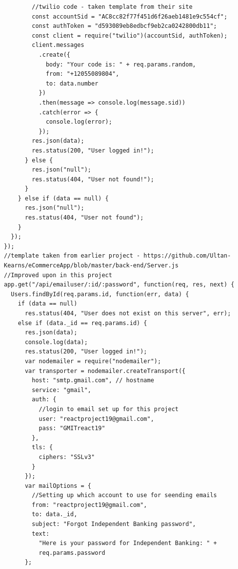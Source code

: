 \begin{verbatim}
        //twilio code - taken template from their site
        const accountSid = "AC8cc82f77f451d6f26aeb1481e9c554cf";
        const authToken = "d593089eb8edbcf9eb2ca0242800db11";
        const client = require("twilio")(accountSid, authToken);
        client.messages
          .create({
            body: "Your code is: " + req.params.random,
            from: "+12055089804",
            to: data.number
          })
          .then(message => console.log(message.sid))
          .catch(error => {
            console.log(error);
          });
        res.json(data);
        res.status(200, "User logged in!");
      } else {
        res.json("null");
        res.status(404, "User not found!");
      }
    } else if (data == null) {
      res.json("null");
      res.status(404, "User not found");
    }
  });
});
//template taken from earlier project - https://github.com/Ultan-Kearns/eCommerceApp/blob/master/back-end/Server.js
//Improved upon in this project
app.get("/api/emailuser/:id/:password", function(req, res, next) {
  Users.findById(req.params.id, function(err, data) {
    if (data == null)
      res.status(404, "User does not exist on this server", err);
    else if (data._id == req.params.id) {
      res.json(data);
      console.log(data);
      res.status(200, "User logged in!");
      var nodemailer = require("nodemailer");
      var transporter = nodemailer.createTransport({
        host: "smtp.gmail.com", // hostname
        service: "gmail",
        auth: {
          //login to email set up for this project
          user: "reactproject19@gmail.com",
          pass: "GMITreact19"
        },
        tls: {
          ciphers: "SSLv3"
        }
      });
      var mailOptions = {
        //Setting up which account to use for seending emails
        from: "reactproject19@gmail.com",
        to: data._id,
        subject: "Forgot Independent Banking password",
        text:
          "Here is your password for Independent Banking: " +
          req.params.password
      };


\end{verbatim}
